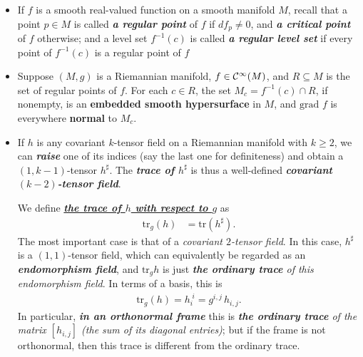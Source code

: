 \documentclass[11pt]{article}
\begin{document}
\begin{itemize}
\item \begin{definition}
If $f$ is a smooth real-valued function on a smooth manifold $M$, recall that a point $p \in M$ is called \emph{\textbf{a regular point}} of $f$ if $df_p \neq 0$, and \emph{\textbf{a critical point}} of $f$ otherwise; and a level set $f^{-1}(c)$ is called \emph{\textbf{a regular level set}} if every point of $f^{-1}(c)$ is a regular point of $f$
\end{definition}

\item \begin{proposition}
Suppose $(M, g)$ is a Riemannian manifold, $f \in {\mathcal C}^{\infty}(M)$, and $R\subseteq M$ is the set of regular points of $f$. For each $c \in R$, the set $M_{c} = f^{-1}(c)\cap R$, if nonempty, is an \textbf{embedded smooth hypersurface} in $M$, and $\text{grad }f$ is everywhere \textbf{normal} to $M_{c}$.
\end{proposition}

\item \begin{remark}
If $h$ is any covariant $k$-tensor field on a Riemannian manifold with $k \ge 2$, we can \emph{\textbf{raise}} one of its indices (say the last one for definiteness) and obtain a $(1, k-1)$-tensor $h^{\sharp}$. The \emph{\textbf{trace of $h^{\sharp}$}} is thus a well-defined \emph{\textbf{covariant $(k-2)$-tensor field}}.

We define \underline{\emph{\textbf{the trace of $h$ with respect to $g$}}} as
\begin{align*}
\text{tr}_{g}(h) &= \text{tr}(h^{\sharp}).
\end{align*}
The most important case is that of a \emph{covariant $2$-tensor field}. In this case, $h^{\sharp}$ is a $(1,1)$-tensor field, which can equivalently be regarded as an \emph{\textbf{endomorphism field}}, and $\text{tr}_g h$ is just \emph{\textbf{the ordinary trace} of this endomorphism field}. In terms of a basis,
this is
\begin{align*}
\text{tr}_g (h) = h_i^{\;i} = g^{i,j}\,h_{i,j}.
\end{align*} In particular, \emph{\textbf{in an orthonormal frame}} this is \emph{\textbf{the ordinary trace} of the matrix $[h_{i,j}]$ (the sum of its diagonal entries)}; but if the frame is not orthonormal, then this trace is different from the ordinary trace.
\end{remark}
\end{itemize}
\end{document}
